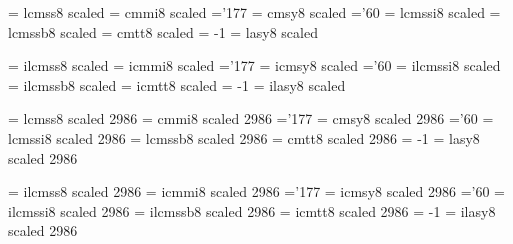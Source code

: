 \font\twentyrm   = lcmss8  scaled  %
\font\twentyi    = cmmi8   scaled  %
    \skewchar\twentyi ='177                  %
\font\twentysy   = cmsy8   scaled  %
    \skewchar\twentysy ='60           %
\font\twentyit   = lcmssi8 scaled  %
\font\twentybf   = lcmssb8 scaled  %
\font\twentytt   = cmtt8   scaled  %
    \hyphenchar\twentytt = -1         %
\font\twentylasy = lasy8  scaled  %

\font\itwentyrm   = ilcmss8  scaled  %
\font\itwentyi    = icmmi8   scaled  %
    \skewchar\itwentyi ='177                  %
\font\itwentysy   = icmsy8   scaled  %
    \skewchar\itwentysy ='60           %
\font\itwentyit   = ilcmssi8 scaled  %
\font\itwentybf   = ilcmssb8 scaled  %
\font\itwentytt   = icmtt8   scaled  %
    \hyphenchar\itwentytt = -1         %
\font\itwentylasy = ilasy8  scaled  %

\font\twentyfourrm   = lcmss8  scaled 2986 %
\font\twentyfouri    = cmmi8   scaled 2986 %
    \skewchar\twentyfouri ='177                  %
\font\twentyfoursy   = cmsy8   scaled 2986 %
    \skewchar\twentyfoursy ='60           %
\font\twentyfourit   = lcmssi8 scaled 2986 %
\font\twentyfourbf   = lcmssb8 scaled 2986 %
\font\twentyfourtt   = cmtt8   scaled 2986 %
    \hyphenchar\twentyfourtt = -1         %
\font\twentyfourlasy = lasy8  scaled 2986 %

\font\itwentyfourrm   = ilcmss8  scaled 2986 %
\font\itwentyfouri    = icmmi8   scaled 2986 %
    \skewchar\itwentyfouri ='177                  %
\font\itwentyfoursy   = icmsy8   scaled 2986 %
    \skewchar\itwentyfoursy ='60           %
\font\itwentyfourit   = ilcmssi8 scaled 2986 %
\font\itwentyfourbf   = ilcmssb8 scaled 2986 %
\font\itwentyfourtt   = icmtt8   scaled 2986 %
    \hyphenchar\itwentyfourtt = -1         %
\font\itwentyfourlasy = ilasy8  scaled 2986 %

